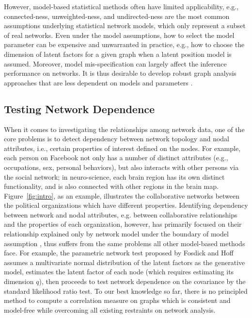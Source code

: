 \documentclass[11pt]{article}
\theoremstyle{definition}
\begin{document}
However, model-based statistical methods often have limited applicability, e.g., connected-ness, unweighted-ness, and undirected-ness are the most common assumptions underlying statistical network models, which only represent a subset of real networks. Even under the model assumptions, how to select the model parameter can be expensive and unwarranted in practice, e.g., how to choose the dimension of latent factors for a given graph when a latent position model is assumed. Moreover, model mis-specification can largely affect the inference performance on networks. It is thus desirable to develop robust graph analysis approaches that are less dependent on models and parameters \cite{ChenShenVogelsteinPriebe2016}.

\subsection{Testing Network Dependence}
When it comes to investigating the relationships among network data, one of the core problems is to detect dependency between network topology and nodal attributes, i.e., certain properties of interest defined on the nodes. For example, each person on Facebook not only has a number of distinct attributes (e.g., occupations, sex, personal behaviors), but also interacts with other persons via the social network; in neuro-science, each brain region has its own distinct functionality, and is also connected with other regions in the brain map. Figure~\ref{fig:intro}, as an example, illustrates the collaborative networks between the political organizations which have different properties. Identifying dependency between network and nodal attributes, e.g. between collaborative relationships and the properties of each organization, however, has primarily focused on their relationship explained only by network model under the boundary of model assumption \cite{wasserman1996logit, fosdick2015testing, howard2016understanding}, thus suffers from the same problems all other model-based methods face. For example, the parametric network test proposed by Fosdick and Hoff \cite{fosdick2015testing} assumes a multivariate normal distribution of the latent factors as the generative model, estimates the latent factor of each node (which requires estimating its dimension $q$), then proceeds to test network dependence on the covariance by the standard likelihood ratio test. To our best knowledge so far, there is no principled method to compute a correlation measure on graphs which is consistent and model-free while overcoming all existing restraints on network analysis. 
\end{document}

